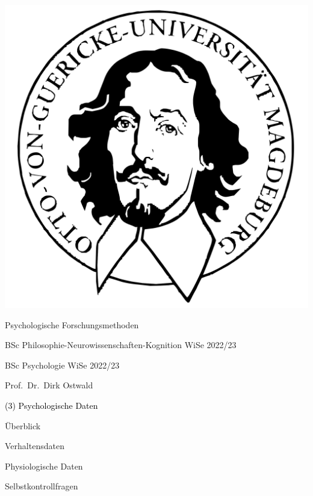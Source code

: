 \documentclass[
  8pt,
  ignorenonframetext,
]{beamer}
\author{}
\date{\vspace{-2.5em}}
\begin{document}
\begin{frame}[plain]{}
\protect\hypertarget{section}{}
\center

\begin{center}\includegraphics[width=0.2\linewidth]{3_Abbildungen/pfm_3_otto} \end{center}

\vspace{2mm}

\Large

Psychologische Forschungsmethoden \vspace{6mm}

\normalsize

BSc Philosophie-Neurowissenschaften-Kognition WiSe 2022/23

BSc Psychologie WiSe 2022/23

\large
\vspace{6mm}

Prof.~Dr.~Dirk Ostwald
\end{frame}

\begin{frame}[plain]{}
\protect\hypertarget{section-1}{}
\vfill
\center
\huge

\textcolor{black}{(3) Psychologische Daten} \vfill
\end{frame}

\begin{frame}{}
\protect\hypertarget{section-2}{}
\Large
{}
\vfill

Überblick

Verhaltensdaten

Physiologische Daten

Selbstkontrollfragen \vfill
\end{frame}
\end{document}
